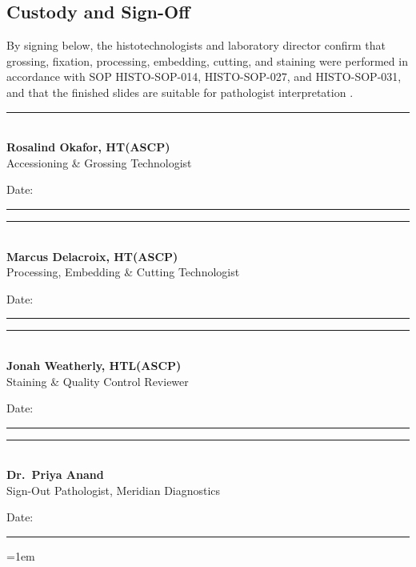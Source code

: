\vspace{10pt}
\subsection{Custody and Sign-Off}
By signing below, the histotechnologists and laboratory director confirm that grossing,
fixation, processing, embedding, cutting, and staining were performed in accordance with
SOP HISTO-SOP-014, HISTO-SOP-027, and HISTO-SOP-031, and that the finished slides are
suitable for pathologist interpretation \citep{bancroft2019theory}.

\vspace{15pt}
\noindent
\begin{minipage}[t]{0.45\linewidth}
  \centering
  \rule{0.9\linewidth}{0.6pt}\\[2pt]
  {\small\sffamily\bfseries Rosalind Okafor, HT(ASCP)}\\[1pt]
  {\footnotesize\sffamily Accessioning \& Grossing Technologist}\\[2pt]
  {\footnotesize\sffamily Date: \rule{1.5cm}{0.4pt}}
\end{minipage}
\hfill
\begin{minipage}[t]{0.45\linewidth}
  \centering
  \rule{0.9\linewidth}{0.6pt}\\[2pt]
  {\small\sffamily\bfseries Marcus Delacroix, HT(ASCP)}\\[1pt]
  {\footnotesize\sffamily Processing, Embedding \& Cutting Technologist}\\[2pt]
  {\footnotesize\sffamily Date: \rule{1.5cm}{0.4pt}}
\end{minipage}
\par
\vspace{15pt}
\noindent
\begin{minipage}[t]{0.45\linewidth}
  \centering
  \rule{0.9\linewidth}{0.6pt}\\[2pt]
  {\small\sffamily\bfseries Jonah Weatherly, HTL(ASCP)}\\[1pt]
  {\footnotesize\sffamily Staining \& Quality Control Reviewer}\\[2pt]
  {\footnotesize\sffamily Date: \rule{1.5cm}{0.4pt}}
\end{minipage}
\hfill
\begin{minipage}[t]{0.45\linewidth}
  \centering
  \rule{0.9\linewidth}{0.6pt}\\[2pt]
  {\small\sffamily\bfseries Dr.\ Priya Anand}\\[1pt]
  {\footnotesize\sffamily Sign-Out Pathologist, Meridian Diagnostics}\\[2pt]
  {\footnotesize\sffamily Date: \rule{1.5cm}{0.4pt}}
\end{minipage}

\vspace{20pt}
\emergencystretch=1em

